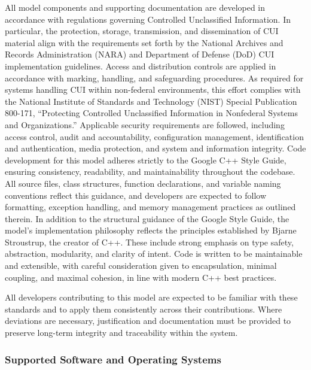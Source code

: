 	\unclass All model components and supporting documentation are developed in accordance with regulations governing
	Controlled Unclassified Information. In particular, the protection, storage, transmission, and dissemination of
	CUI material align with the requirements set forth by the National Archives and Records Administration (NARA)
	and Department of Defense (DoD) CUI implementation guidelines. Access and distribution controls are applied
	in accordance with marking, handling, and safeguarding procedures.
	\unclass As required for systems handling CUI within non-federal environments, this effort complies with the National
	Institute of Standards and Technology (NIST) Special Publication 800-171, ``Protecting Controlled Unclassified
	Information in Nonfederal Systems and Organizations.'' Applicable security requirements are followed, including
	access control, audit and accountability, configuration management, identification and authentication, media
	protection, and system and information integrity.
	\unclass Code development for this model adheres strictly to the Google C++ Style Guide, ensuring consistency,
	readability, and maintainability throughout the codebase. All source files, class structures, function declarations,
	and variable naming conventions reflect this guidance, and developers are expected to follow formatting,
	exception handling, and memory management practices as outlined therein.
	\unclass In addition to the structural guidance of the Google Style Guide, the model’s implementation philosophy
	reflects the principles established by Bjarne Stroustrup, the creator of C++. These include strong emphasis on
	type safety, abstraction, modularity, and clarity of intent. Code is written to be maintainable and extensible,
	with careful consideration given to encapsulation, minimal coupling, and maximal cohesion, in line with modern
	C++ best practices.
	
	\unclass All developers contributing to this model are expected to be familiar with these standards and to apply
	them consistently across their contributions. Where deviations are necessary, justification and documentation
	must be provided to preserve long-term integrity and traceability within the system.
	
	\subsubsection{\unclass Supported Software and Operating Systems}
	

